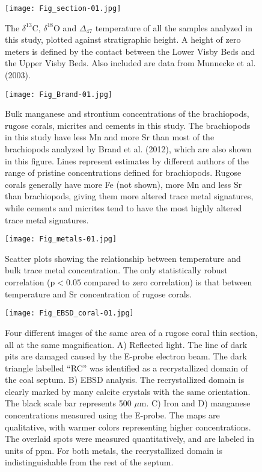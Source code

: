 \documentclass{article}
\newcommand{\deltao}{$\delta^{18}$}
\newcommand{\deltac}{$\delta^{13}$}
\begin{document}
\begin{sidewaysfigure}[htb]
\centering
\texttt{[image: Fig\_section-01.jpg]}
\caption{The \deltac C, \deltao O and $\Delta_{47}$ temperature of all the samples analyzed in this study, plotted against stratigraphic height. A height of zero meters is defined by the contact between the Lower Visby Beds and the Upper Visby Beds. Also included are data from Munnecke et al. (2003).}
\label{section}
\end{sidewaysfigure}

\begin{figure}[htb]
\centering
\texttt{[image: Fig\_Brand-01.jpg]}
\caption{Bulk manganese and strontium concentrations of the brachiopods, rugose corals, micrites and cements in this study. The brachiopods in this study have less Mn and more Sr than most of the brachiopods analyzed by Brand et al. (2012), which are also shown in this figure. Lines represent estimates by different authors of the range of pristine concentrations defined for brachiopods. Rugose corals generally have more Fe (not shown), more Mn and less Sr than brachiopods, giving them more altered trace metal signatures, while cements and micrites tend to have the most highly altered trace metal signatures.}
\label{Brand}
\end{figure}

\begin{figure}[htb]
\centering
\texttt{[image: Fig\_metals-01.jpg]}
\caption{Scatter plots showing the relationship between temperature and bulk trace metal concentration. The only statistically robust correlation ($\text{p}<0.05$ compared to zero correlation) is that between temperature and Sr concentration of rugose corals.}
\label{metals}
\end{figure}

\begin{figure}[htb]
\centering
\texttt{[image: Fig\_EBSD\_coral-01.jpg]}
\caption{Four different images of the same area of a rugose coral thin section, all at the same magnification. A) Reflected light. The line of dark pits are damaged caused by the E-probe electron beam. The dark triangle labelled ``RC'' was identified as a recrystallized domain of the coal septum. B) EBSD analysis. The recrystallized domain is clearly marked by many calcite crystals with the same orientation. The black scale bar represents 500 $\mu$m. C) Iron and D) manganese concentrations measured using the E-probe. The maps are qualitative, with warmer colors representing higher concentrations. The overlaid spots were measured quantitatively, and are labeled in units of ppm. For both metals, the recrystallized domain is indistinguishable from the rest of the septum.}
\label{EBSD_coral}
\end{figure}
\end{document}
